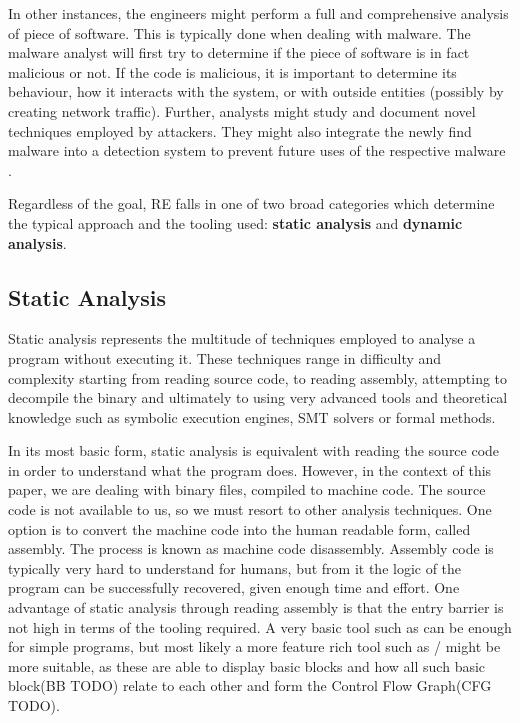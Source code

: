In other instances, the engineers might perform a full and comprehensive analysis of piece of software. This is typically done when dealing with malware. The malware analyst will first try to determine if the piece of software is in fact malicious or not. If the code is malicious, it is important to determine its behaviour, how it interacts with the system, or with outside entities (possibly by creating network traffic). Further, analysts might study and document novel techniques employed by attackers. They might also integrate the newly find malware into a detection system to prevent future uses of the respective malware \cite{malware_crowdstrike}.

Regardless of the goal, RE falls in one of two broad categories which determine the typical approach and the tooling used: \textbf{static analysis} and \textbf{dynamic analysis}.

\subsection{Static Analysis}

Static analysis represents the multitude of techniques employed to analyse a program without executing it. These techniques range in difficulty and complexity starting from reading source code, to reading assembly, attempting to decompile the binary and ultimately to using very advanced tools and theoretical knowledge such as symbolic execution engines, SMT solvers or formal methods.

In its most basic form, static analysis is equivalent with reading the source code in order to understand what the program does. However, in the context of this paper, we are dealing with binary files, compiled to machine code. The source code is not available to us, so we must resort to other analysis techniques. One option is to convert the machine code into the human readable form, called assembly. The process is known as machine code disassembly. Assembly code is typically very hard to understand for humans, but from it the logic of the program can be successfully recovered, given enough time and effort. One advantage of static analysis through reading assembly is that the entry barrier is not high in terms of the tooling required. A very basic tool such as  \cite{TODO} can be enough for simple programs, but most likely a more feature rich tool such as / \cite{TODO} might be more suitable, as these are able to display basic blocks and how all such basic block(BB TODO) relate to each other and form the Control Flow Graph(CFG TODO).

